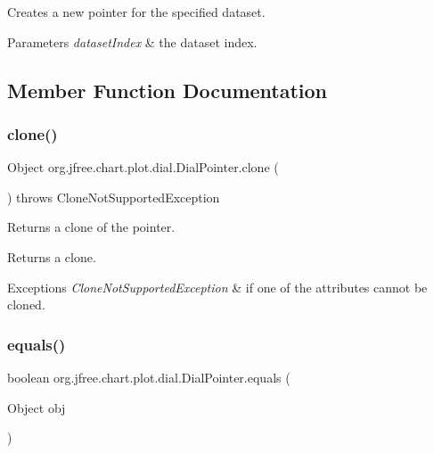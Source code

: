 Creates a new pointer for the specified dataset.


\begin{DoxyParams}{Parameters}
{\em dataset\+Index} & the dataset index. \\
\hline
\end{DoxyParams}


\subsection{Member Function Documentation}
\mbox{\label{classorg_1_1jfree_1_1chart_1_1plot_1_1dial_1_1_dial_pointer_a2b5507c1f4ba0861db867becae60f7db}} 
\subsubsection{\texorpdfstring{clone()}{clone()}}
{\footnotesize\ttfamily Object org.\+jfree.\+chart.\+plot.\+dial.\+Dial\+Pointer.\+clone (\begin{DoxyParamCaption}{ }\end{DoxyParamCaption}) throws Clone\+Not\+Supported\+Exception}

Returns a clone of the pointer.

\begin{DoxyReturn}{Returns}
a clone.
\end{DoxyReturn}

\begin{DoxyExceptions}{Exceptions}
{\em Clone\+Not\+Supported\+Exception} & if one of the attributes cannot be cloned. \\
\hline
\end{DoxyExceptions}
\mbox{\label{classorg_1_1jfree_1_1chart_1_1plot_1_1dial_1_1_dial_pointer_a06948d75bb40d404d21cd4695ac3253a}} 
\subsubsection{\texorpdfstring{equals()}{equals()}}
{\footnotesize\ttfamily boolean org.\+jfree.\+chart.\+plot.\+dial.\+Dial\+Pointer.\+equals (\begin{DoxyParamCaption}\item[{Object}]{obj }\end{DoxyParamCaption})}

